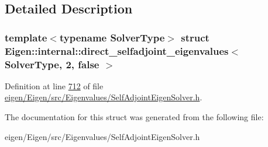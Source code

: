 \subsection{Detailed Description}
\subsubsection*{template$<$typename Solver\+Type$>$\newline
struct Eigen\+::internal\+::direct\+\_\+selfadjoint\+\_\+eigenvalues$<$ Solver\+Type, 2, false $>$}



Definition at line \hyperlink{eigen_2_eigen_2src_2_eigenvalues_2_self_adjoint_eigen_solver_8h_source_l00712}{712} of file \hyperlink{eigen_2_eigen_2src_2_eigenvalues_2_self_adjoint_eigen_solver_8h_source}{eigen/\+Eigen/src/\+Eigenvalues/\+Self\+Adjoint\+Eigen\+Solver.\+h}.



The documentation for this struct was generated from the following file\+:\begin{DoxyCompactItemize}
\item 
eigen/\+Eigen/src/\+Eigenvalues/\+Self\+Adjoint\+Eigen\+Solver.\+h\end{DoxyCompactItemize}
